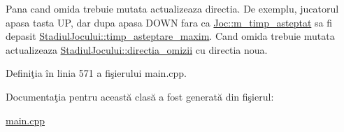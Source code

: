 Pana cand omida trebuie mutata actualizeaza directia. De exemplu, jucatorul apasa tasta UP, dar dupa apasa D\+O\+WN fara ca \hyperlink{classJoc_a24e667d511404dd6479a86575f0969c2}{Joc\+::m\+\_\+timp\+\_\+asteptat} sa fi depasit \hyperlink{classStadiulJocului_a4cdf9582b472e74980e1eee73ca94769}{Stadiul\+Jocului\+::timp\+\_\+asteptare\+\_\+maxim}. Cand omida trebuie mutata actualizeaza \hyperlink{classStadiulJocului_a79d2c301f57a7fc525534994ffd7057e}{Stadiul\+Jocului\+::directia\+\_\+omizii} cu directia noua. 

Definiţia în linia 571 a fişierului main.\+cpp.



Documentaţia pentru această clasă a fost generată din fişierul\+:\begin{DoxyCompactItemize}
\item 
\hyperlink{main_8cpp}{main.\+cpp}\end{DoxyCompactItemize}
